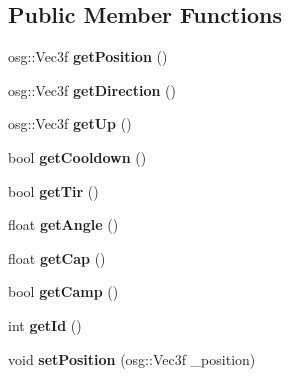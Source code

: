 \subsection*{Public Member Functions}
\begin{DoxyCompactItemize}
\item 
\hypertarget{classAvion_aabc1d61f8cca9bb48d24858f805c4c95}{osg\+::\+Vec3f {\bfseries get\+Position} ()}\label{classAvion_aabc1d61f8cca9bb48d24858f805c4c95}

\item 
\hypertarget{classAvion_a18cfee825cfc95a63c38e9c33bbccfbe}{osg\+::\+Vec3f {\bfseries get\+Direction} ()}\label{classAvion_a18cfee825cfc95a63c38e9c33bbccfbe}

\item 
\hypertarget{classAvion_ae9d814e6736160e6732617945506ac76}{osg\+::\+Vec3f {\bfseries get\+Up} ()}\label{classAvion_ae9d814e6736160e6732617945506ac76}

\item 
\hypertarget{classAvion_a0dcfe702e314a9de909221f7646aeb04}{bool {\bfseries get\+Cooldown} ()}\label{classAvion_a0dcfe702e314a9de909221f7646aeb04}

\item 
\hypertarget{classAvion_ab697527c4adf96008244ab2656d696ba}{bool {\bfseries get\+Tir} ()}\label{classAvion_ab697527c4adf96008244ab2656d696ba}

\item 
\hypertarget{classAvion_a4499563f99a4b8c84055c43a0d7ec7b6}{float {\bfseries get\+Angle} ()}\label{classAvion_a4499563f99a4b8c84055c43a0d7ec7b6}

\item 
\hypertarget{classAvion_a069fb11c8aa32b1b957e427d66f3b92c}{float {\bfseries get\+Cap} ()}\label{classAvion_a069fb11c8aa32b1b957e427d66f3b92c}

\item 
\hypertarget{classAvion_abc7259db1069bd5703c5f239461792f3}{bool {\bfseries get\+Camp} ()}\label{classAvion_abc7259db1069bd5703c5f239461792f3}

\item 
\hypertarget{classAvion_a0791e7759e9c278a13e0987a60faabb8}{int {\bfseries get\+Id} ()}\label{classAvion_a0791e7759e9c278a13e0987a60faabb8}

\item 
\hypertarget{classAvion_ad332cfa9f8d09120011d123f98e8ee87}{void {\bfseries set\+Position} (osg\+::\+Vec3f \+\_\+position)}\label{classAvion_ad332cfa9f8d09120011d123f98e8ee87}


\end{DoxyCompactItemize}
